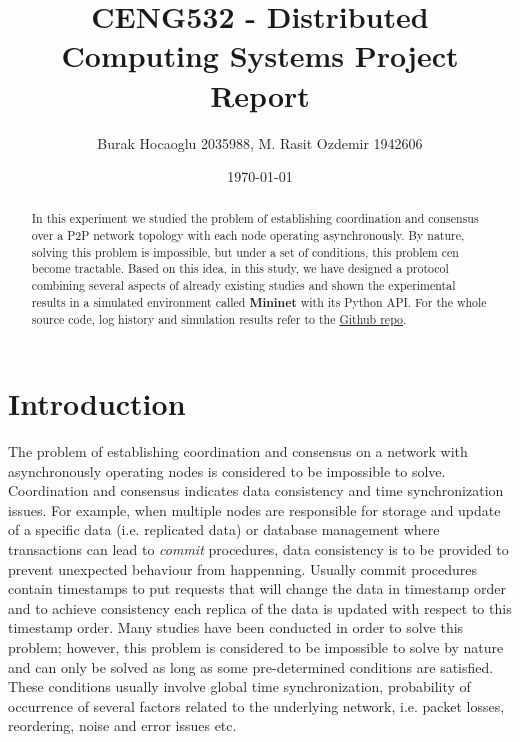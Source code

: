 \documentclass[a4paper, 12pt]{article}
\begin{document}
\title{CENG532 - Distributed Computing Systems Project Report}
\author{Burak Hocaoglu 2035988, M. Rasit Ozdemir 1942606}
\date{\today}
\maketitle

\begin{abstract}
In this experiment we studied the problem of establishing coordination and consensus over a P2P network topology with each node operating asynchronously. By nature, solving this problem is impossible, but under a set of conditions, this problem cen become tractable. Based on this idea, in this study, we have designed a protocol combining several aspects of already existing studies and shown the experimental results in a simulated environment called \textbf{Mininet} with its Python API. For the whole source code, log history and simulation results refer to the \href{https://github.com/burakceng/CENG532-DistributedComputing-Project.git}{Github repo}.
\end{abstract}

\section{Introduction}

The problem of establishing coordination and consensus on a network with asynchronously operating nodes is considered to be impossible to solve. Coordination and consensus indicates data consistency and time synchronization issues. For example, when multiple nodes are responsible for storage and update of a specific data (i.e. replicated data) or database management where transactions can lead to \textit{commit} procedures, data consistency is to be provided to prevent unexpected behaviour from happenning. Usually commit procedures contain timestamps to put requests that will change the data in timestamp order and to achieve consistency each replica of the data is updated with respect to this timestamp order. Many studies have been conducted in order to solve this problem; however, this problem is considered to be impossible to solve by nature and can only be solved as long as some pre-determined conditions are satisfied. These conditions usually involve global time synchronization, probability of occurrence of several factors related to the underlying network, i.e. packet losses, reordering, noise and error issues etc.
\end{document}
